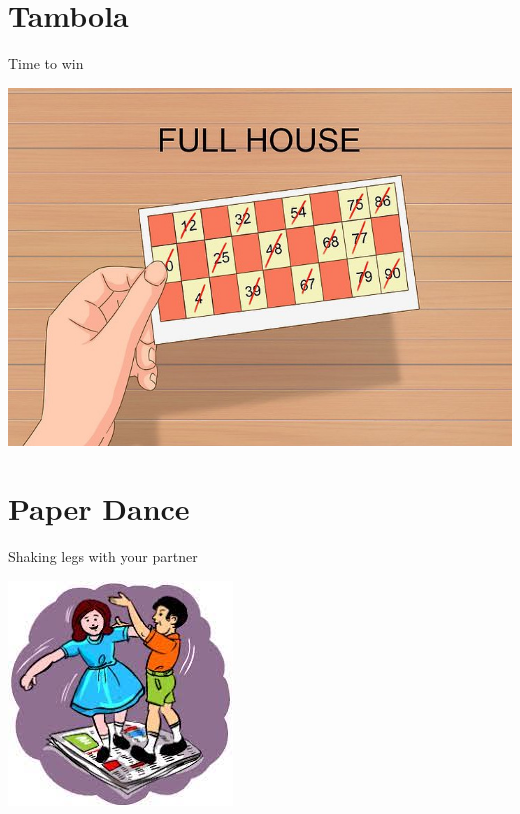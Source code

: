 \documentclass[makeidx, 11pt, oneside, onecolumn, openright, final, svgnames, dvipsnames, extrafontsizes]{memoir}
\begin{document}
\chapter{Tambola}
\thispagestyle{empty}
\begin{center}
Time to win 
\end{center}
\begin{center}
\includegraphics[scale=1]{tambola.jpg}
\end{center}



\chapter{Paper Dance}
\thispagestyle{empty}

\begin{center}
Shaking legs with your partner 
\end{center}

\begin{center}
\includegraphics[scale=1]{paper.jpeg}
\end{center}
\end{document}
